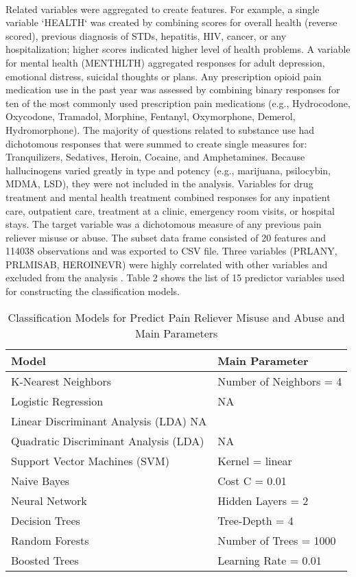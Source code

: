 \\\documentclass[sigconf]{acmart}
\begin{document}
Related variables were aggregated to create features. For example, a single 
variable `HEALTH` was created by combining scores for overall health (reverse 
scored), previous diagnosis of STDs, hepatitis, HIV, cancer, or any 
hospitalization; higher scores indicated higher level of health problems. 
A variable for mental health (MENTHLTH) aggregated responses for adult 
depression, emotional distress, suicidal thoughts or plans. Any prescription 
opioid pain medication use in the past year was assessed by combining binary 
responses for ten of the most commonly used prescription pain medications 
(e.g., Hydrocodone, Oxycodone, Tramadol, Morphine, Fentanyl, Oxymorphone, 
Demerol, Hydromorphone). The majority of questions related to substance use 
had dichotomous responses that were summed to create single measures for: 
Tranquilizers, Sedatives, Heroin, Cocaine, and Amphetamines. Because 
hallucinogens varied greatly in type and potency (e.g., marijuana, 
psilocybin, MDMA, LSD), they were not included in the analysis. Variables 
for drug treatment and mental health treatment combined responses for any 
inpatient care, outpatient care, treatment at a clinic, emergency room visits, 
or hospital stays. The target variable was a dichotomous measure of any 
previous pain reliever misuse or abuse. The subset data frame consisted of 
20 features and 114038 observations and was exported to CSV file. Three 
variables (PRLANY, PRLMISAB, HEROINEVR) were highly correlated with other 
variables and excluded from the analysis . Table 2 shows the list of 15
predictor variables used for constructing the classification models. 


\begin{table}
  \caption{Classification Models for Predict Pain Reliever Misuse 
  and Abuse and Main Parameters}
  \label{tab:freq}
  \begin{tabular}{ll}
    \toprule
    Model & Main Parameter \\
    \midrule
    K-Nearest Neighbors & Number of Neighbors = 4 \\
    Logistic Regression & NA \\
    Linear Discriminant Analysis (LDA) NA \\
    Quadratic Discriminant Analysis (LDA) & NA \\
    Support Vector Machines (SVM) & Kernel = linear \\
    Naive Bayes & Cost C = 0.01 \\
    Neural Network & Hidden Layers = 2 \\
    Decision Trees & Tree-Depth = 4 \\ 
    Random Forests & Number of Trees = 1000 \\
    Boosted Trees & Learning Rate = 0.01 \\ 
    \bottomrule
  \end{tabular}
\end{table}
\end{document}
